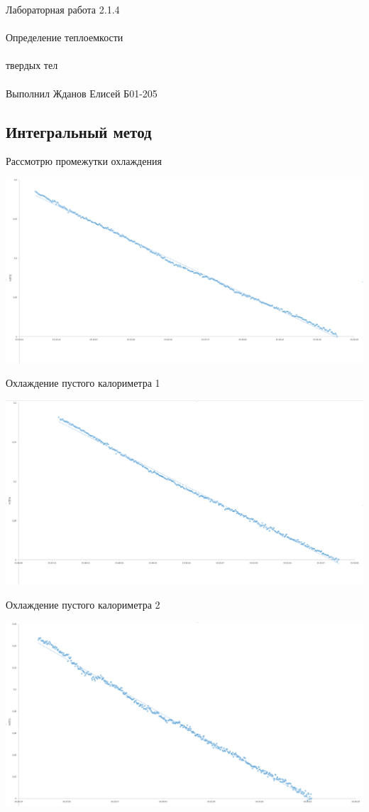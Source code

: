 \documentclass{astroedu-lab}
\begin{document}
\begin{problem}{\huge Лабораторная работа 2.1.4\\\\Определение теплоемкости\\\\твердых тел\\\\Выполнил Жданов Елисей Б01-205}
\subsection{Интегральный метод}

Рассмотрю промежутки охлаждения

\begin{center}
\includegraphics[width=1\textwidth]{картинки/2023-02-10_01-26-06.png}
\label{ris:image}
\end{center}

Охлаждение пустого калориметра 1

\begin{center}
\includegraphics[width=1\textwidth]{картинки/2023-02-10_01-46-44.png}
\label{ris:image}
\end{center}

Охлаждение пустого калориметра 2

\begin{center}
\includegraphics[width=1\textwidth]{картинки/2023-02-10_01-54-50.png}
\label{ris:image}
\end{center}


\end{problem}
\end{document}
